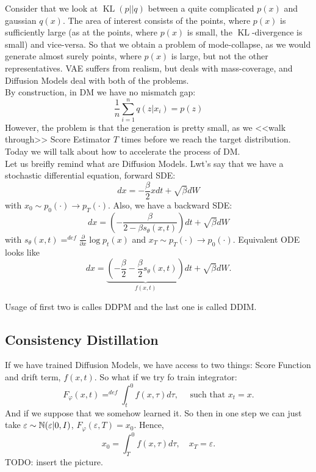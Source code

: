 Consider that we look at $\operatorname{KL}(p || q)$ between a quite complicated $p(x)$ and gaussian $q(x)$. The area of interest consists of the points, where $p(x)$ is sufficiently large (as at the points, where $p(x)$ is small, the $\operatorname{KL}$-divergence is small) and vice-versa. So that we obtain a problem of mode-collapse, as we would generate almost surely points, where $p(x)$ is large, but not the other representatives. VAE suffers from realism, but deals with mass-coverage, and Diffusion Models deal with both of the problems. \\ 

By construction, in DM we have no mismatch gap: 
\[ 
    \frac{1}{n} \sum_{i=1}^n q(z | x_i) = p(z) 
\]
However, the problem is that the generation is pretty small, as we <<walk through>> Score Estimator $T$ times before we reach the target distribution. Today we will talk about how to accelerate the process of DM. \\ 

Let us breifly remind what are Diffusion Models. Lwt's say that we have a stochastic differential equation, forward SDE: 
\[
    dx = -\frac{\beta}{2} x dt + \sqrt{\beta} dW
\]
with $x_0 \sim p_0(\cdot) \to p_T(\cdot )$. Also, we have a backward SDE:
\[
    dx = \left( -\frac{\beta}{2 - \beta s_\theta(x, t)} \right) dt + \sqrt{\beta} dW
\]
with $s_\theta(x, t) =^{def} \frac{\partial}{\partial x} \log p_t(x)$ and $x_T \sim p_T(\cdot) \to p_0(\cdot)$. Equivalent ODE looks like 
\[
    dx = \underbrace{\left( -\frac{\beta}{2} - \frac{\beta}{2} s_\theta(x, t) \right)}_{f(x, t)} dt + \sqrt{\beta} dW.
\]
\begin{eremark}
    Usage of first two is calles DDPM and the last one is called DDIM.
\end{eremark}

\subsection{Consistency Distillation}

If we have trained Diffusion Models, we have access to two things: Score Function and drift term, $f(x, t)$. So what if we try fo train integrator: 
\[
    F_\varphi(x, t) =^{def} \int_t^0 f(x, \tau) d \tau, \quad \text{ such that } x_t = x.
\]
And if we suppose that we somehow learned it. So then in one step we can just take $\varepsilon \sim \operatorname{\mathbb{N}}(\varepsilon | 0, I)$, $F_\varphi(\varepsilon, T) = x_0$. Hence, 
\[
    x_0 = \int_T^0 f(x, \tau) d \tau, \quad x_T = \varepsilon.
\]
TODO: insert the picture. \\

